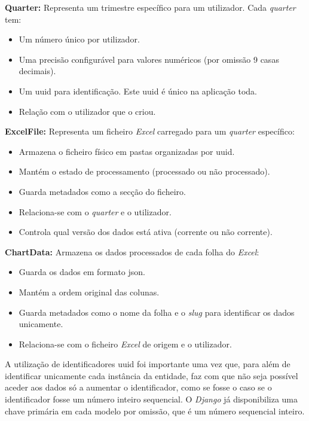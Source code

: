 \textbf{Quarter:} Representa um trimestre específico para um utilizador. Cada \textit{quarter} tem:
\begin{itemize}
    \item Um número único por utilizador.
    \item Uma precisão configurável para valores numéricos (por omissão 9 casas decimais).
    \item Um \gls{uuid} para identificação. Este \gls{uuid} é único na aplicação toda.
    \item Relação com o utilizador que o criou.
\end{itemize}

\textbf{ExcelFile:} Representa um ficheiro \textit{Excel} carregado para um \textit{quarter} específico:
\begin{itemize}
    \item Armazena o ficheiro físico em pastas organizadas por \gls{uuid}.
    \item Mantém o estado de processamento (processado ou não processado).
    \item Guarda metadados como a secção do ficheiro.
    \item Relaciona-se com o \textit{quarter} e o utilizador.
    \item Controla qual versão dos dados está ativa (corrente ou não corrente).
\end{itemize}

\textbf{ChartData:} Armazena os dados processados de cada folha do \textit{Excel}:
\begin{itemize}
    \item Guarda os dados em formato \gls{json}.
    \item Mantém a ordem original das colunas.
    \item Guarda metadados como o nome da folha e o \textit{slug} para identificar os dados unicamente.
    \item Relaciona-se com o ficheiro \textit{Excel} de origem e o utilizador.
\end{itemize}

A utilização de identificadores \gls{uuid} foi importante uma vez que, para além de identificar unicamente cada instância da entidade, faz com que não seja possível aceder aos dados só a aumentar o identificador, como se fosse o caso se o identificador fosse um número inteiro sequencial. O \textit{Django} já disponibiliza uma chave primária em cada modelo por omissão, que é um número sequencial inteiro.

